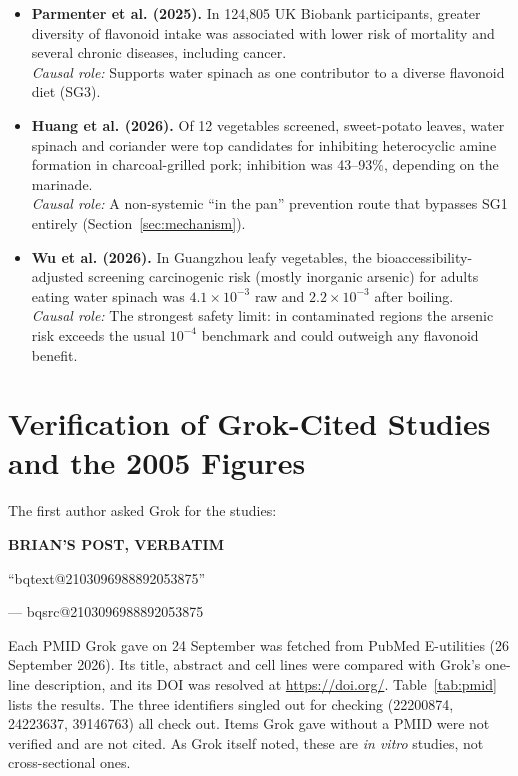 \documentclass[11pt,a4paper]{article}
\makeatletter
\newcommand{\BQ}[1]{\begin{tcolorbox}[bqstyle]%
{\sffamily\bfseries\footnotesize\color{teal!80!black}BRIAN'S POST, VERBATIM}\par\smallskip
``\csname bqtext@#1\endcsname''\par\smallskip
{\raggedleft\footnotesize --- \csname bqsrc@#1\endcsname\par}\end{tcolorbox}}
\newenvironment{litlist}{\begin{itemize}[leftmargin=2.6em,labelwidth=2.2em,labelsep=0.4em,align=left,itemsep=5pt,topsep=4pt]}{\end{itemize}}
\newcommand{\litentry}[4]{\item[\cite{#1}] \textbf{\color{navy}#2.} #3\\[1pt]
  {\color{teal}\textit{Causal role:}} #4}
\makeatother
\begin{document}
\begin{litlist}
\litentry{parmenter2025}{Parmenter et al. (2025)}{In 124{,}805 UK Biobank participants, greater diversity of flavonoid intake was associated with lower risk of mortality and several chronic diseases, including cancer.}{Supports water spinach as one contributor to a diverse flavonoid diet (SG3).}

\litentry{huang2026}{Huang et al. (2026)}{Of 12 vegetables screened, sweet-potato leaves, water spinach and coriander were top candidates for inhibiting heterocyclic amine formation in charcoal-grilled pork; inhibition was 43--93\%, depending on the marinade.}{A non-systemic ``in the pan'' prevention route that bypasses SG1 entirely (Section~\ref{sec:mechanism}).}

\litentry{wu2026}{Wu et al. (2026)}{In Guangzhou leafy vegetables, the bioaccessibility-adjusted screening carcinogenic risk (mostly inorganic arsenic) for adults eating water spinach was $4.1\times10^{-3}$ raw and $2.2\times10^{-3}$ after boiling.}{The strongest safety limit: in contaminated regions the arsenic risk exceeds the usual $10^{-4}$ benchmark and could outweigh any flavonoid benefit.}
\end{litlist}

\section{Verification of Grok-Cited Studies and the 2005 Figures}
\label{sec:verification}

The first author asked Grok for the studies:

\BQ{2103096988892053875}

\noindent Each PMID Grok gave on 24 September was fetched from PubMed E-utilities (26 September 2026). Its title, abstract and cell lines were compared with Grok's one-line description, and its DOI was resolved at \url{https://doi.org/}. Table~\ref{tab:pmid} lists the results. The three identifiers singled out for checking (22200874, 24223637, 39146763) all check out. Items Grok gave without a PMID were not verified and are not cited. As Grok itself noted, these are \emph{in vitro} studies, not cross-sectional ones.
\end{document}
